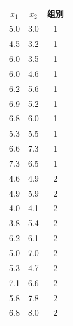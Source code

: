 \begin{center}
\begin{tabular}{ccc}
$x_1$&$x_2$&组别\\ \midrule
5.0&3.0&1\\
4.5&3.2&1\\
6.0&3.5&1\\
6.0&4.6&1\\
6.2&5.6&1\\
6.9&5.2&1\\
6.8&6.0&1\\
5.3&5.5&1\\
6.6&7.3&1\\
7.3&6.5&1\\
4.6&4.9&2\\
4.9&5.9&2\\
4.0&4.1&2\\
3.8&5.4&2\\
6.2&6.1&2\\
5.0&7.0&2\\
5.3&4.7&2\\
7.1&6.6&2\\
5.8&7.8&2\\
6.8&8.0&2\\
\end{tabular}
\end{center}

